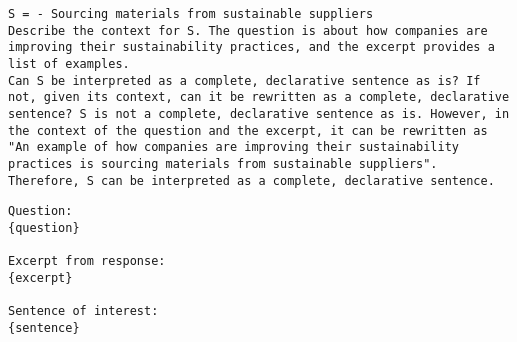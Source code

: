 \begin{tcolorbox}
\begin{lstlisting}[breaklines=true, breakindent=0pt, basicstyle=\small\ttfamily\raggedright, xleftmargin=-5pt, frame=none, xrightmargin=-5pt, aboveskip=-2pt, belowskip=-2pt]
S = - Sourcing materials from sustainable suppliers
Describe the context for S. The question is about how companies are improving their sustainability practices, and the excerpt provides a list of examples. 
Can S be interpreted as a complete, declarative sentence as is? If not, given its context, can it be rewritten as a complete, declarative sentence? S is not a complete, declarative sentence as is. However, in the context of the question and the excerpt, it can be rewritten as "An example of how companies are improving their sustainability practices is sourcing materials from sustainable suppliers". Therefore, S can be interpreted as a complete, declarative sentence.
\end{lstlisting}
\end{tcolorbox}

\begin{tcolorbox}[
    breakable,                    
    colback=white,                
    colframe=black,              
    title=Invalid Sentences User Prompt,       
    title after break=Invalid Sentences User Prompt (Continued),
    fonttitle=\bfseries, 
    coltext=black,
    before skip=5pt,
]
\begin{lstlisting}[breaklines=true, breakindent=0pt, basicstyle=\small\ttfamily\raggedright, xleftmargin=-5pt, frame=none, xrightmargin=-5pt, aboveskip=-2pt, belowskip=-2pt]
Question:
{question}

Excerpt from response: 
{excerpt}

Sentence of interest: 
{sentence}
\end{lstlisting}
\end{tcolorbox}